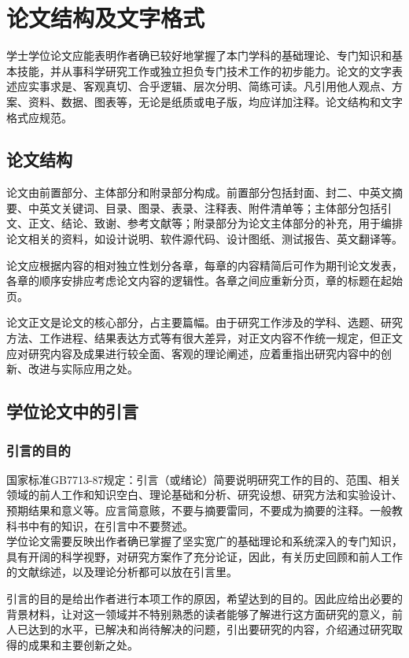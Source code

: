 
\chapter{论文结构及文字格式}
学士学位论文应能表明作者确已较好地掌握了本门学科的基础理论、专门知识和基本技能，并从事科学研究工作或独立担负专门技术工作的初步能力。论文的文字表述应实事求是、客观真切、合乎逻辑、层次分明、简练可读。凡引用他人观点、方案、资料、数据、图表等，无论是纸质或电子版，均应详加注释。论文结构和文字格式应规范。
\section{论文结构}
论文由前置部分、主体部分和附录部分构成。前置部分包括封面、封二、中英文摘要、中英文关键词、目录、图录、表录、注释表、附件清单等；主体部分包括引文、正文、结论、致谢、参考文献等；附录部分为论文主体部分的补充，用于编排论文相关的资料，如设计说明、软件源代码、设计图纸、测试报告、英文翻译等。

论文应根据内容的相对独立性划分各章，每章的内容精简后可作为期刊论文发表，各章的顺序安排应考虑论文内容的逻辑性。各章之间应重新分页，章的标题在起始页。

论文正文是论文的核心部分，占主要篇幅。由于研究工作涉及的学科、选题、研究方法、工作进程、结果表达方式等有很大差异，对正文内容不作统一规定，但正文应对研究内容及成果进行较全面、客观的理论阐述，应着重指出研究内容中的创新、改进与实际应用之处。


\section{学位论文中的引言}
\subsection{引言的目的}
国家标准GB7713-87规定：引言（或绪论）简要说明研究工作的目的、范围、相关领域的前人工作和知识空白、理论基础和分析、研究设想、研究方法和实验设计、预期结果和意义等。应言简意赅，不要与摘要雷同，不要成为摘要的注释。一般教科书中有的知识，在引言中不要赘述。\\
学位论文需要反映出作者确已掌握了坚实宽广的基础理论和系统深入的专门知识，具有开阔的科学视野，对研究方案作了充分论证，因此，有关历史回顾和前人工作的文献综述，以及理论分析都可以放在引言里。

引言的目的是给出作者进行本项工作的原因，希望达到的目的。因此应给出必要的背景材料，让对这一领域并不特别熟悉的读者能够了解进行这方面研究的意义，前人已达到的水平，已解决和尚待解决的问题，引出要研究的内容，介绍通过研究取得的成果和主要创新之处。



